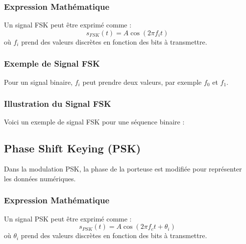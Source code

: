 \documentclass[10pt,a4paper]{article}
\begin{document}
\subsubsection*{Expression Mathématique}
Un signal FSK peut être exprimé comme :
\[ s_{FSK}(t) = A \cos(2\pi f_i t) \]
où \( f_i \) prend des valeurs discrètes en fonction des bits à transmettre.

\subsubsection*{Exemple de Signal FSK}
Pour un signal binaire, \( f_i \) peut prendre deux valeurs, par exemple \( f_0 \) et \( f_1 \).

\subsubsection*{Illustration du Signal FSK}
Voici un exemple de signal FSK pour une séquence binaire :


\subsection*{Phase Shift Keying (PSK)}
Dans la modulation PSK, la phase de la porteuse est modifiée pour représenter les données numériques.

\subsubsection*{Expression Mathématique}
Un signal PSK peut être exprimé comme :
\[ s_{PSK}(t) = A \cos(2\pi f_c t + \theta_i) \]
où \( \theta_i \) prend des valeurs discrètes en fonction des bits à transmettre.
\end{document}
